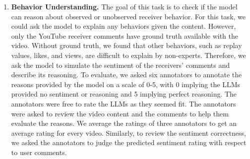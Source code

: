 \begin{enumerate}[leftmargin=*]
    \item\textbf{Behavior Understanding.} The goal of this task is to check if the model can reason about observed or unobserved receiver behavior. For this task, we could ask the model to explain any behaviors given the content. However, only the YouTube receiver comments have ground truth available with the video. Without ground truth, we found that other behaviors, such as replay values, likes, and views, are difficult to explain by non-experts. Therefore, we ask the model to simulate the sentiment of the receivers' comments and describe its reasoning. To evaluate, we asked six annotators to annotate the reasons provided by the model on a scale of 0-5, with 0 implying the LLMs provided no sentiment or reasoning and 5 implying perfect reasoning. The annotators were free to rate the LLMs as they seemed fit. The annotators were asked to review the video content and the comments to help them evaluate the reasons. We average the ratings of three annotators to get an average rating for every video. Similarly, to review the sentiment correctness, we asked the annotators to judge the predicted sentiment rating with respect to user comments.
    

\end{enumerate}
